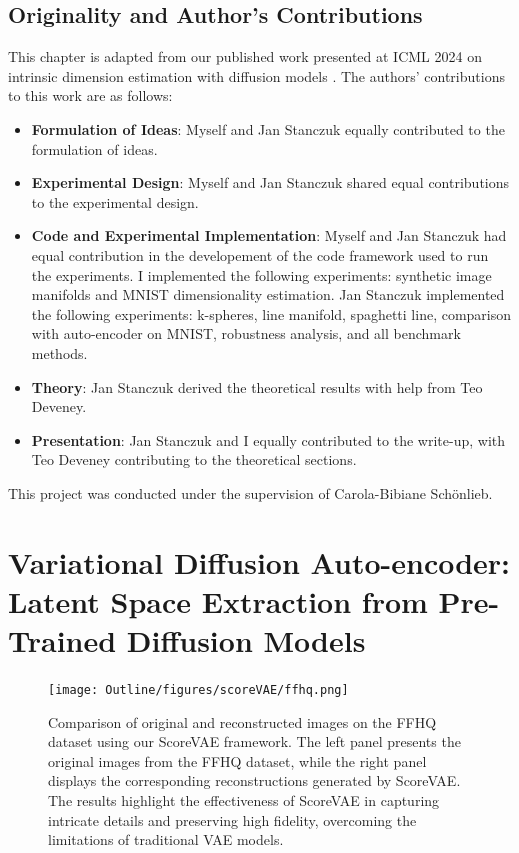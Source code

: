\subsection*{Originality and Author’s Contributions}

This chapter is adapted from our published work presented at ICML 2024 on intrinsic dimension estimation with diffusion models \cite{pmlr-v235-stanczuk24a}. The authors' contributions to this work are as follows:

\begin{itemize}
\item \textbf{Formulation of Ideas}: Myself and Jan Stanczuk equally contributed to the formulation of ideas.
\item \textbf{Experimental Design}: Myself and Jan Stanczuk shared equal contributions to the experimental design.
\item \textbf{Code and Experimental Implementation}: Myself and Jan Stanczuk had equal contribution in the developement of the code framework used to run the experiments. I implemented the following experiments: synthetic image manifolds and MNIST dimensionality estimation. Jan Stanczuk implemented the following experiments: k-spheres, line manifold, spaghetti line, comparison with auto-encoder on MNIST, robustness analysis, and all benchmark methods.
\item \textbf{Theory}: Jan Stanczuk derived the theoretical results with help from Teo Deveney.
\item \textbf{Presentation}: Jan Stanczuk and I equally contributed to the write-up, with Teo Deveney contributing to the theoretical sections.
\end{itemize}

This project was conducted under the supervision of Carola-Bibiane Sch\"onlieb.

\section{Variational Diffusion Auto-encoder: Latent Space Extraction from Pre-Trained Diffusion Models}

\begin{figure}[htbp]
    \centering
    \texttt{[image: Outline/figures/scoreVAE/ffhq.png]}
    \caption{Comparison of original and reconstructed images on the FFHQ dataset using our ScoreVAE framework. The left panel presents the original images from the FFHQ dataset, while the right panel displays the corresponding reconstructions generated by ScoreVAE. The results highlight the effectiveness of ScoreVAE in capturing intricate details and preserving high fidelity, overcoming the limitations of traditional VAE models.}
    \label{fig:ffhq}
\end{figure}


